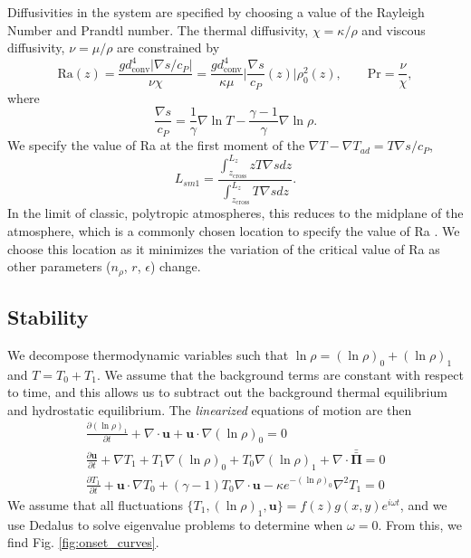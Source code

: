 \documentclass[twocolumn]{aastex61}
\newcommand{\grad}{\ensuremath{\nabla}}
\newcommand{\stressT}{\ensuremath{\bm{\bar{\bar{\Pi}}}}}
\begin{document}
Diffusivities in the system are specified by choosing a value of the Rayleigh
Number and Prandtl number.  The thermal diffusivity, $\chi = \kappa / \rho$ and
viscous diffusivity, $\nu = \mu / \rho$ are constrained by
\begin{equation}
\text{Ra}(z) = \frac{g d_{\text{conv}}^4 \bigg|\grad s / c_P\bigg|}{\nu\chi} = 
\frac{g d_{\text{conv}}^4}{\kappa\mu}\bigg|\frac{\grad s}{c_P}(z)\bigg|\rho_0^2(z),\qquad
\text{Pr} = \frac{\nu}{\chi},
\end{equation}
where 
\begin{equation}
\frac{\grad s}{c_P} = \frac{1}{\gamma} \grad\ln T - \frac{\gamma-1}{\gamma} \grad \ln \rho.
\end{equation}
We specify the value of Ra at the first moment of the $\grad T - \grad T_{ad} = T \grad s / c_P$,
\begin{equation}
L_{sm1} = \frac{\int_{z_{\text{cross}}}^{L_z} z T\grad s dz}{\int_{z_{\text{cross}}}^{L_z} T\grad s dz}.
\end{equation}
In the limit of classic, polytropic atmospheres, this reduces to the midplane of the atmosphere,
which is a commonly chosen location to specify the value of Ra \citep{hurlburt&all1984}.  We choose this location as it
minimizes the variation of the critical value of Ra as other parameters ($n_\rho$, $r$, $\epsilon$)
change.

\subsection{Stability}
We decompose thermodynamic variables such that $\ln\rho = (\ln\rho)_0 + (\ln\rho)_1$
and $T = T_0 + T_1$.  We assume that the background terms are constant with respect to
time, and this allows us to subtract out the background thermal equilibrium and
hydrostatic equilibrium.  The \emph{linearized} equations of motion are then
\begin{equation}
\begin{split}
\frac{\partial (\ln\rho)_1}{\partial t} + \grad\cdot\bm{u} + \bm{u}\cdot\grad(\ln\rho)_0 = 0 \\
\frac{\partial \bm{u}}{\partial t} + \grad T_1 + T_1 \grad(\ln\rho)_0 + T_0 \grad(\ln\rho)_1
+ \grad \cdot\stressT = 0 \\
\frac{\partial T_1}{\partial t} + \bm{u}\cdot\grad T_0 + (\gamma-1)T_0\grad\cdot\bm{u} - \kappa e^{-(\ln\rho)_0}
\grad^2 T_1 = 0
\end{split}
\end{equation}
We assume that all fluctuations $\{ T_1, (\ln\rho)_1, \bm{u} \} = f(z) g(x, y) e^{i\omega t}$, and we
use Dedalus to solve eigenvalue problems to determine when $\omega = 0$.  From this, we find
Fig. \ref{fig:onset_curves}.
\end{document}
